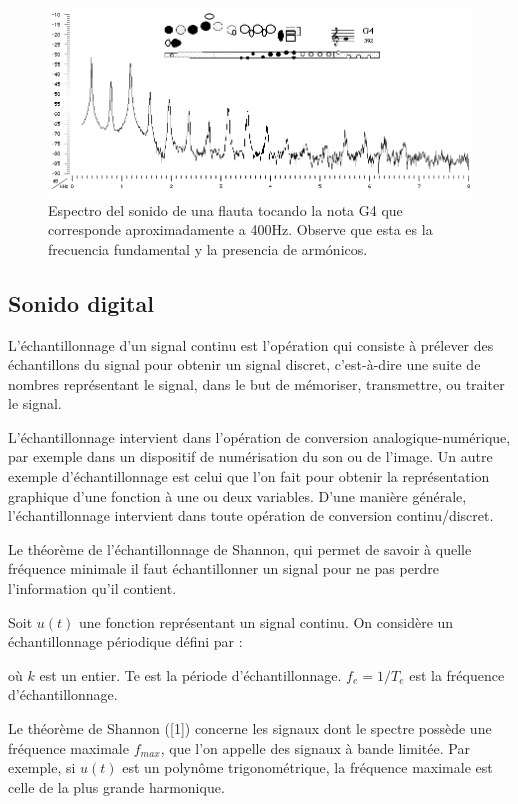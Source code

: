 \documentclass[conference,onecolumn]{IEEEtran}
\begin{document}
 \begin{figure}[H]
 \centering
    \includegraphics[scale=0.8]{img4.png}
    \caption{Espectro del sonido de una flauta tocando la nota G4 que corresponde aproximadamente a 400Hz. Observe que esta es la frecuencia fundamental y la presencia de armónicos.}
\end{figure}

\subsection{Sonido digital}

L'échantillonnage d'un signal continu est l'opération qui consiste à prélever des échantillons du signal pour obtenir un signal discret, c'est-à-dire une suite de nombres représentant le signal, dans le but de mémoriser, transmettre, ou traiter le signal. 

L'échantillonnage intervient dans l'opération de conversion analogique-numérique, par exemple dans un dispositif de numérisation du son ou de l'image. Un autre exemple d'échantillonnage est celui que l'on fait pour obtenir la représentation graphique d'une fonction à une ou deux variables. D'une manière générale, l'échantillonnage intervient dans toute opération de conversion continu/discret. 

Le théorème de l'échantillonnage de Shannon, qui permet de savoir à quelle fréquence minimale il faut échantillonner un signal pour ne pas perdre l'information qu'il contient. 

Soit $u(t)$ une fonction représentant un signal continu. On considère un échantillonnage périodique défini par : 

où $k$ est un entier. Te est la période d'échantillonnage. $f_e=1/T_e$ est la fréquence d'échantillonnage. 

Le théorème de Shannon ([1]) concerne les signaux dont le spectre possède une fréquence maximale $f_{max}$, que l'on appelle des signaux à bande limitée. Par exemple, si $u(t)$ est un polynôme trigonométrique, la fréquence maximale est celle de la plus grande harmonique.
\end{document}
